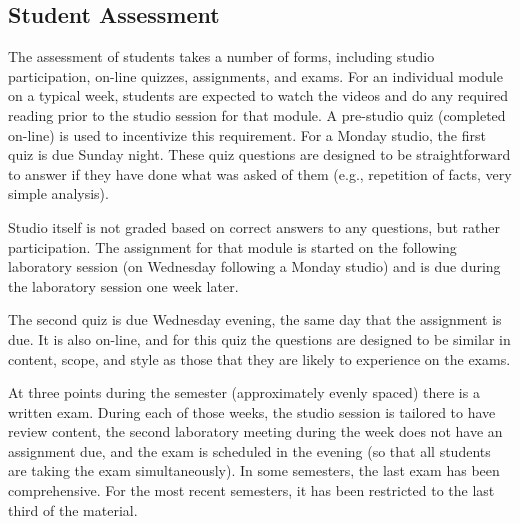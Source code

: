 \subsection{Student Assessment}

The assessment of students takes a number of forms, including studio
participation, on-line quizzes, assignments, and exams.
For an individual module on a typical week,
students are expected to watch the videos
and do any required reading prior to the studio session for that module.
A pre-studio quiz (completed on-line) is used to incentivize this
requirement.  For a Monday studio, the first quiz is due Sunday night.
These quiz questions are designed to be straightforward to answer if
they have done what was asked of them (e.g., repetition of facts,
very simple analysis).

Studio itself is not graded based on correct answers to any questions, but
rather participation. The assignment for that module is started on the
following laboratory session (on Wednesday following a Monday studio)
and is due during the laboratory session one week later.

The second quiz is due Wednesday evening, the same day that the assignment
is due. It is also on-line, and for this quiz the questions are designed
to be similar in content, scope, and style as those that they are likely to
experience on the exams. 

At three points during the semester (approximately evenly spaced) there
is a written exam.  During each of those weeks, the
studio session is tailored to have review content, the second laboratory
meeting during the week does not have an assignment due, and the
exam is scheduled in the evening (so that all students are taking the
exam simultaneously).
In some semesters, the last exam has been comprehensive.  For the most
recent semesters, it has been restricted to the last third of the material.
